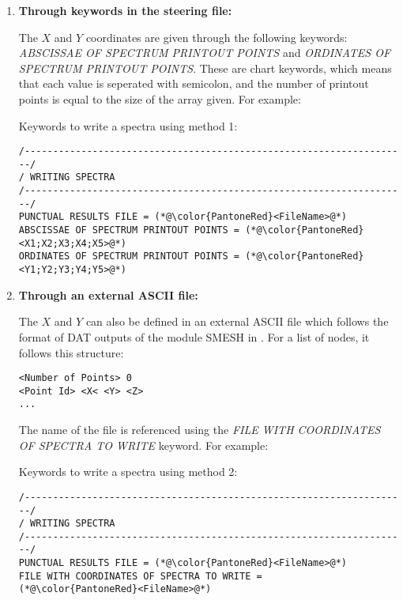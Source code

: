 \begin{enumerate}

\item \textbf{Through keywords in the steering file:}

The $X$ and $Y$ coordinates are given through the following keywords:
\textit{ABSCISSAE OF SPECTRUM PRINTOUT POINTS} and \textit{ORDINATES OF SPECTRUM PRINTOUT POINTS}.
These are chart keywords, which means that each value is seperated with semicolon, and the number
of printout points is equal to the size of the array given. For example:

\begin{CommentBlock}{Keywords to write a spectra using method 1:}
\lstset{language=TelemacCas,
        basicstyle=\scriptsize\ttfamily}
\begin{lstlisting}[frame=trBL]
/--------------------------------------------------------------------/
/ WRITING SPECTRA
/--------------------------------------------------------------------/
PUNCTUAL RESULTS FILE = (*@\color{PantoneRed}<FileName>@*)
ABSCISSAE OF SPECTRUM PRINTOUT POINTS = (*@\color{PantoneRed}<X1;X2;X3;X4;X5>@*)
ORDINATES OF SPECTRUM PRINTOUT POINTS = (*@\color{PantoneRed}<Y1;Y2;Y3;Y4;Y5>@*)
\end{lstlisting}
\end{CommentBlock}

\item \textbf{Through an external ASCII file:}

The $X$ and $Y$ can also be defined in an external ASCII file which follows the format of DAT
outputs of the module {\scshape SMESH} in \salome{}. For a list of nodes, it follows this structure:

\lstset{language=TelemacCas,
        basicstyle=\scriptsize\ttfamily}
\begin{lstlisting}[frame=trBL]
<Number of Points> 0
<Point Id> <X< <Y> <Z>
...
\end{lstlisting}

The name of the file is referenced using the \textit{FILE WITH COORDINATES OF SPECTRA TO WRITE} keyword.
For example:

\begin{CommentBlock}{Keywords to write a spectra using method 2:}
\lstset{language=TelemacCas,
        basicstyle=\scriptsize\ttfamily}
\begin{lstlisting}[frame=trBL]
/--------------------------------------------------------------------/
/ WRITING SPECTRA
/--------------------------------------------------------------------/
PUNCTUAL RESULTS FILE = (*@\color{PantoneRed}<FileName>@*)
FILE WITH COORDINATES OF SPECTRA TO WRITE =
(*@\color{PantoneRed}<FileName>@*)
\end{lstlisting}
\end{CommentBlock}


\end{enumerate}

